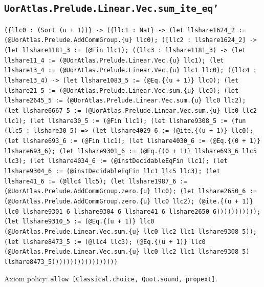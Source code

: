 \documentclass[11pt]{article}
\begin{document}
\subsection*{\texttt{UorAtlas.Prelude.Linear.Vec.sum\_ite\_eq'}}
\noindent\texttt{(\{llc0 : (Sort (u + 1))\} -> (\{llc1 : Nat\} -> (let llshare1624\_2 := (@UorAtlas.Prelude.AddCommGroup.\{u\} llc0); ([llc2 : llshare1624\_2] -> (let llshare1181\_3 := (@Fin llc1); ((llc3 : llshare1181\_3) -> (let llshare11\_4 := (@UorAtlas.Prelude.Linear.Vec.\{u\} llc1); (let llshare13\_4 := (@UorAtlas.Prelude.Linear.Vec.\{u\} llc1 llc0); ((llc4 : llshare13\_4) -> (let llshare1083\_5 := (@Eq.\{(u + 1)\} llc0); (let llshare21\_5 := (@UorAtlas.Prelude.Linear.Vec.sum.\{u\} llc0); (let llshare2645\_5 := (@UorAtlas.Prelude.Linear.Vec.sum.\{u\} llc0 llc2); (let llshare6667\_5 := (@UorAtlas.Prelude.Linear.Vec.sum.\{u\} llc0 llc2 llc1); (let llshare30\_5 := (@Fin llc1); (let llshare9308\_5 := (fun (llc5 : llshare30\_5) => (let llshare4029\_6 := (@ite.\{(u + 1)\} llc0); (let llshare693\_6 := (@Fin llc1); (let llshare4030\_6 := (@Eq.\{(0 + 1)\} llshare693\_6); (let llshare9301\_6 := (@Eq.\{(0 + 1)\} llshare693\_6 llc5 llc3); (let llshare4034\_6 := (@instDecidableEqFin llc1); (let llshare9304\_6 := (@instDecidableEqFin llc1 llc5 llc3); (let llshare41\_6 := (@llc4 llc5); (let llshare1987\_6 := (@UorAtlas.Prelude.AddCommGroup.zero.\{u\} llc0); (let llshare2650\_6 := (@UorAtlas.Prelude.AddCommGroup.zero.\{u\} llc0 llc2); (@ite.\{(u + 1)\} llc0 llshare9301\_6 llshare9304\_6 llshare41\_6 llshare2650\_6))))))))))); (let llshare9310\_5 := (@Eq.\{(u + 1)\} llc0 (@UorAtlas.Prelude.Linear.Vec.sum.\{u\} llc0 llc2 llc1 llshare9308\_5)); (let llshare8473\_5 := (@llc4 llc3); (@Eq.\{(u + 1)\} llc0 (@UorAtlas.Prelude.Linear.Vec.sum.\{u\} llc0 llc2 llc1 llshare9308\_5) llshare8473\_5))))))))))))))))))}\par
\noindent Axiom policy: \texttt{allow [Classical.choice, Quot.sound, propext]}.\par
\end{document}
